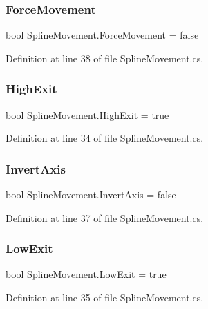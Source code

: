 \subsubsection{\texorpdfstring{Force\+Movement}{ForceMovement}}
{\footnotesize\ttfamily bool Spline\+Movement.\+Force\+Movement = false}



Definition at line 38 of file Spline\+Movement.\+cs.

\mbox{\label{class_spline_movement_a21c86cdee895ba1a71af2eeaf28f51eb}} 
\subsubsection{\texorpdfstring{High\+Exit}{HighExit}}
{\footnotesize\ttfamily bool Spline\+Movement.\+High\+Exit = true}



Definition at line 34 of file Spline\+Movement.\+cs.

\mbox{\label{class_spline_movement_a2417f1ad0eeec517e5896c16175af012}} 
\subsubsection{\texorpdfstring{Invert\+Axis}{InvertAxis}}
{\footnotesize\ttfamily bool Spline\+Movement.\+Invert\+Axis = false}



Definition at line 37 of file Spline\+Movement.\+cs.

\mbox{\label{class_spline_movement_ae7ef31a81a9bef0a404aa5aff3ec5e2b}} 
\subsubsection{\texorpdfstring{Low\+Exit}{LowExit}}
{\footnotesize\ttfamily bool Spline\+Movement.\+Low\+Exit = true}



Definition at line 35 of file Spline\+Movement.\+cs.


